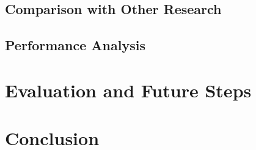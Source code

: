 \documentclass[10pt,journal,compsoc]{IEEEtran}
\begin{document}
\subsection{Comparison with Other Research}

\subsection{Performance Analysis}

\section{Evaluation and Future Steps}

\section{Conclusion}

\newpage



\end{document}
